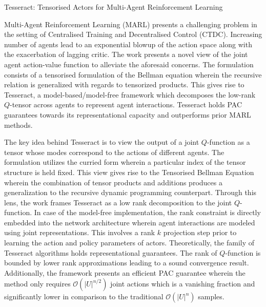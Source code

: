 \documentclass[11pt,letterpaper]{article}
\begin{document}
\begin{center}
  \large{Tesseract: Tensorised Actors for Multi-Agent Reinforcement Learning}
\end{center}

Multi-Agent Reinforcement Learning (MARL) presents a challenging problem in the setting of Centralised Training and Decentralised Control (CTDC). Increasing number of agents lead to an exponential blowup of the action space along with the exacerbation of lagging critic. The work presents a novel view of the joint agent action-value function to alleviate the aforesaid concerns. The formulation consists of a tensorised formulation of the Bellman equation wherein the recursive relation is generalized with regards to tensorized products. This gives rise to Tesseract, a model-based/model-free framework which decomposes the low-rank $Q$-tensor across agents to represent agent interactions. Tesseract holds PAC guarantees towards its representational capacity and outperforms prior MARL methods.

The key idea behind Tesseract is to view the output of a joint $Q$-function as a tensor whose modes correspond to the actions of different agents. The formulation utilizes the curried form wherein a particular index of the tensor structure is held fixed. This view gives rise to the Tensorised Bellman Equation wherein the combination of tensor products and additions produces a generalization to the recursive dynamic programming counterpart. Through this lens, the work frames Tesseract as a low rank decomposition to the joint $Q$-function. In case of the model-free implementation, the rank constraint is directly embedded into the network architecture wherein agent interactions are modeled using joint representations. This involves a rank $k$ projection step prior to learning the action and policy parameters of actors. Theoretically, the family of Tesseract algorithms holds representational guarantees. The rank of $Q$-function is bounded by lower rank approximations leading to a sound convergence result. Additionally, the framework presents an efficient PAC guarantee wherein the method only requires $\mathcal{O}(|U|^{n/2})$ joint actions which is a vanishing fraction and significantly lower in comparison to the traditional $\mathcal{O}(|U|^{n})$ samples.
\end{document}
